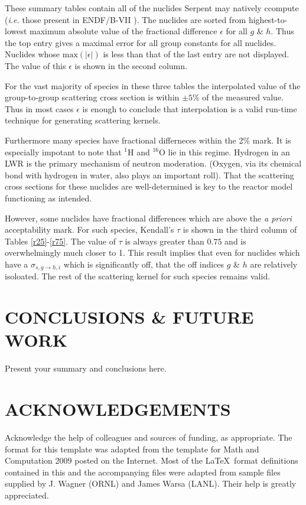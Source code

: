 \documentclass{physor2012}
\newcommand{\superscript}[1]{\ensuremath{^{\textrm{#1}}}}
\newcommand{\nuc}[2]{\superscript{#2}{#1}}
\begin{document}
These summary tables contain all of the nuclides Serpent may natively ccompute
(\emph{i.e.} those present in ENDF/B-VII \cite{}).  The nuclides are sorted from
highest-to-lowest maximum absolute value of the fractional difference $\epsilon$
for all $g$ \& $h$.  Thus the top entry gives a maximal error for all group
constants for all nuclides.  Nuclides whose $\mbox{max}(|\epsilon|)$ is less than 
that of the last entry are not displayed.  The value of this $\epsilon$ is 
shown in the second column.

For the vast majority of species in these three tables the interpolated value of 
the group-to-group scattering cross section is within $\pm 5\%$ of the measured 
value.  Thus in most cases $\epsilon$ is enough to conclude that interpolation 
is a valid run-time technique for generating scattering kernels.

Furthermore many species have fractional differneces within the 2\% mark. 
It is especially impotant to note that \nuc{H}{1} and \nuc{O}{16} lie in 
this regime.  Hydrogen in an LWR is the primary mechanism of neutron 
moderation.  (Oxygen, via its chemical bond with hydrogen in water, also 
plays an important roll).  That the scattering cross sections for these nuclides
are well-determined is key to the reactor model functioning as intended.

However, some nuclides have fractional differences which are above the
\emph{a priori} acceptability mark.  For such species, Kendall's $\tau$ is
shown in the third column of Tables \ref{r25}-\ref{r75}.  The value of
$\tau$ is always greater than $0.75$ and is overwhelmingly much closer to 1.
This result implies that even for nuclides which have a $\sigma_{s,g\to h,i}$ which
is significantly off, that the off indices $g$ \& $h$ are relatively isoloated.  
The rest of the scattering kernel for such species remains valid.



\clearpage

%
\section{CONCLUSIONS \& FUTURE WORK}
\label{sec:conclusions}
%
Present your summary and conclusions here.
%
\section*{ACKNOWLEDGEMENTS}
%
Acknowledge the help of colleagues and sources of funding, as appropriate.
%
The format for this template was adapted from the template for Math and Computation 2009 
posted on the Internet.  Most of the \LaTeX\ format definitions contained
in this and the accompanying files were adapted from sample files supplied 
by J. Wagner (ORNL) and James Warsa (LANL). Their help is greatly appreciated.

%
\setlength{\baselineskip}{12pt}


\end{document}
